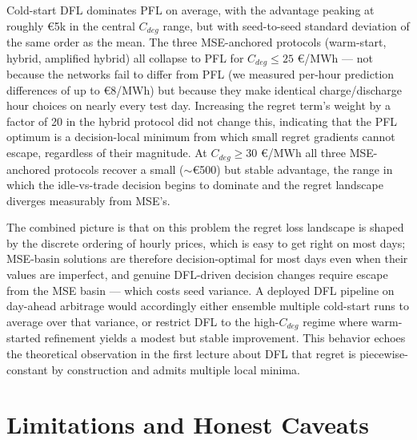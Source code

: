 \documentclass[11pt,a4paper]{article}
\begin{document}
Cold-start DFL dominates PFL on average, with the advantage peaking at roughly \euro5k in the central $C_{deg}$ range, but with seed-to-seed standard deviation of the same order as the mean. The three MSE-anchored protocols (warm-start, hybrid, amplified hybrid) all collapse to PFL for $C_{deg} \leq 25$
\euro/MWh — not because the networks fail to differ from PFL (we measured per-hour prediction differences of up to \euro 8/MWh) but because they make identical charge/discharge hour choices on nearly every test day. Increasing the regret term's weight by a factor of 20 in the hybrid protocol did not change this, indicating that the PFL optimum is a decision-local minimum from which small regret gradients cannot escape, regardless of their magnitude. At $C_{deg} \geq 30$
\euro/MWh all three MSE-anchored protocols recover a small ($\sim$\euro500) but stable advantage, the range in which the idle-vs-trade decision begins to dominate and the regret landscape diverges measurably from MSE's.

The combined picture is that on this problem the regret loss landscape is shaped by the discrete ordering of hourly prices, which is easy to get right on most days; MSE-basin solutions are therefore decision-optimal for most days even when their values are imperfect, and genuine DFL-driven decision changes require escape from the MSE basin — which costs seed variance. A deployed DFL pipeline on day-ahead arbitrage would accordingly either ensemble multiple cold-start runs to average over that variance, or restrict DFL to the high-$C_{deg}$ regime where warm-started refinement yields a modest but stable improvement. This behavior echoes the theoretical observation in the first lecture about DFL that regret is piecewise-constant by construction and admits multiple local minima.

\section{Limitations and Honest Caveats}
\end{document}

